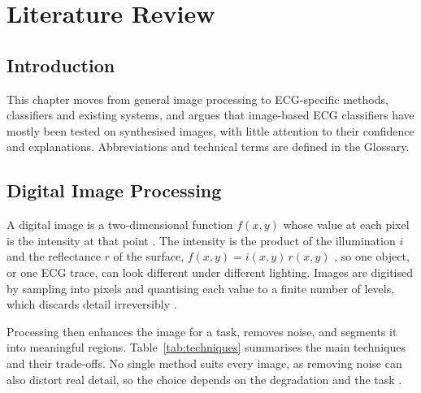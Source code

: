 \chapter{Literature Review}
\label{ch:lit}
\section{Introduction}

This chapter moves from general image processing to ECG-specific methods, classifiers and existing systems, and argues that image-based ECG classifiers have mostly been tested on synthesised images, with little attention to their confidence and explanations. Abbreviations and technical terms are defined in the Glossary.

\section{Digital Image Processing}
\label{sec:image-processing}

A digital image is a two-dimensional function $f(x,y)$ whose value at each pixel is the intensity at that point \cite{gonzalez_digital_2018}. The intensity is the product of the illumination $i$ and the reflectance $r$ of the surface, $f(x,y) = i(x,y)\,r(x,y)$ \cite{stockham_image_1972}, so one object, or one ECG trace, can look different under different lighting. Images are digitised by sampling into pixels and quantising each value to a finite number of levels, which discards detail irreversibly \cite{gonzalez_digital_2018}.

Processing then enhances the image for a task, removes noise, and segments it into meaningful regions. Table~\ref{tab:techniques} summarises the main techniques and their trade-offs. No single method suits every image, as removing noise can also distort real detail, so the choice depends on the degradation and the task \cite{qi_comprehensive_2022}.

